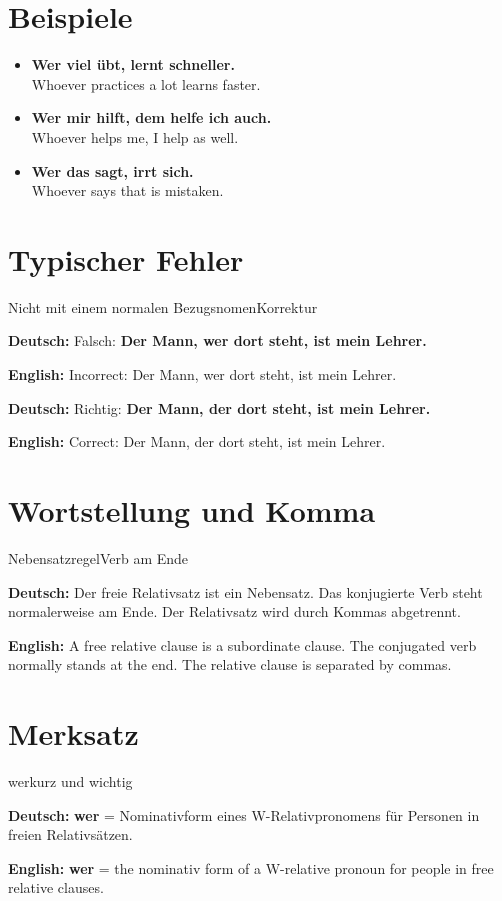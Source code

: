 \documentclass[a4paper,11pt]{article}
\newcommand{\GermanText}[1]{\textbf{Deutsch: }#1\par}
\newcommand{\EnglishText}[1]{{\small\color{SoftGray}\textbf{English: }#1\par}}
\newcommand{\ExampleItem}[2]{\item \textbf{#1}\\{\small\color{SoftGray}#2}}
\begin{document}
\section{Beispiele}

\begin{exbox}

\begin{itemize}

\ExampleItem{Wer viel übt, lernt schneller.}{Whoever practices a lot learns faster.}

\ExampleItem{Wer mir hilft, dem helfe ich auch.}{Whoever helps me, I help as well.}

\ExampleItem{Wer das sagt, irrt sich.}{Whoever says that is mistaken.}

\end{itemize}

\end{exbox}

\section{Typischer Fehler}

\begin{grammarentry}{Nicht mit einem normalen Bezugsnomen}{Korrektur}

\GermanText{Falsch: \textbf{Der Mann, wer dort steht, ist mein Lehrer.}}

\EnglishText{Incorrect: Der Mann, wer dort steht, ist mein Lehrer.}

\GermanText{Richtig: \textbf{Der Mann, der dort steht, ist mein Lehrer.}}

\EnglishText{Correct: Der Mann, der dort steht, ist mein Lehrer.}

\end{grammarentry}

\section{Wortstellung und Komma}

\begin{grammarentry}{Nebensatzregel}{Verb am Ende}

\GermanText{Der freie Relativsatz ist ein Nebensatz. Das konjugierte Verb steht normalerweise am Ende. Der Relativsatz wird durch Kommas abgetrennt.}

\EnglishText{A free relative clause is a subordinate clause. The conjugated verb normally stands at the end. The relative clause is separated by commas.}

\end{grammarentry}

\section{Merksatz}

\begin{grammarentry}{wer}{kurz und wichtig}

\GermanText{\textbf{wer} = Nominativform eines W-Relativpronomens für Personen in freien Relativsätzen.}

\EnglishText{\textbf{wer} = the nominativ form of a W-relative pronoun for people in free relative clauses.}

\end{grammarentry}
\end{document}
